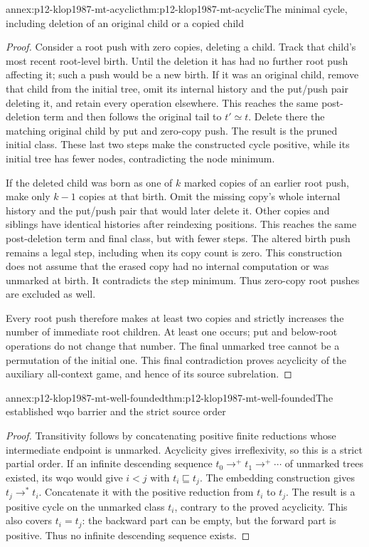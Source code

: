 \begin{annexitem}{annex:p12-klop1987-mt-acyclic}{thm:p12-klop1987-mt-acyclic}{The minimal cycle, including deletion of an original child or a copied child}
\begin{proof}
Consider a root push with zero copies, deleting a child. Track that
child's most recent root-level birth. Until the deletion it has had
no further root push affecting it; such a push would be a new birth.
If it was an original child, remove that child from the initial tree,
omit its internal history and the put/push pair deleting it, and
retain every operation elsewhere. This reaches the same post-deletion
term and then follows the original tail to \(t'\simeq t\).
Delete there the matching original child by put and zero-copy push.
The result is the pruned initial class. These last two steps make
the constructed cycle positive, while its initial tree has fewer
nodes, contradicting the node minimum.

If the deleted child was born as one of \(k\) marked copies of
an earlier root push, make only \(k-1\) copies at that birth.
Omit the missing copy's whole internal history and the put/push pair
that would later delete it. Other copies and siblings have identical
histories after reindexing positions. This reaches the same
post-deletion term and final class, but with fewer steps. The altered
birth push remains a legal step, including when its copy count is
zero. This construction does not assume that the erased copy had
no internal computation or was unmarked at birth. It contradicts
the step minimum. Thus zero-copy root pushes are excluded as well.

Every root push therefore makes at least two copies and strictly
increases the number of immediate root children. At least one occurs;
put and below-root operations do not change that number. The final
unmarked tree cannot be a permutation of the initial one. This final
contradiction proves acyclicity of the auxiliary all-context game,
and hence of its source subrelation.
\end{proof}
\end{annexitem}

\begin{annexitem}{annex:p12-klop1987-mt-well-founded}{thm:p12-klop1987-mt-well-founded}{The established wqo barrier and the strict source order}
\begin{proof}
Transitivity follows by concatenating positive finite reductions whose
intermediate endpoint is unmarked. Acyclicity gives irreflexivity,
so this is a strict partial order. If an infinite descending sequence
\(t_0\to^+t_1\to^+\cdots\) of unmarked trees existed, its wqo
would give \(i<j\) with \(t_i\sqsubseteq t_j\).
The embedding construction gives \(t_j\to^*t_i\).
Concatenate it with the positive reduction from \(t_i\) to
\(t_j\). The result is a positive cycle on the unmarked class
\(t_i\), contrary to the proved acyclicity. This also covers
\(t_i=t_j\): the backward part can be empty, but the forward
part is positive. Thus no infinite descending sequence exists.
\end{proof}
\end{annexitem}

